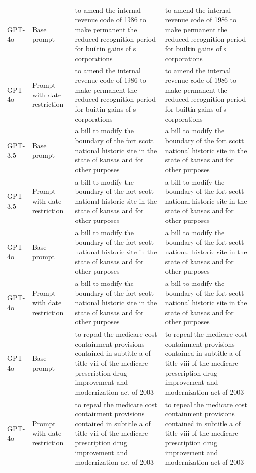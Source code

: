 \begin{longtable}{>{\raggedright\arraybackslash}p{1.4cm}>{\raggedright\arraybackslash}p{1.4cm}>{\raggedright\arraybackslash}p{5.5cm}>{\raggedright\arraybackslash}p{5.5cm}}
GPT-4o & Base prompt & to amend the internal revenue code of 1986 to make permanent the reduced recognition period for builtin gains of s corporations & to amend the internal revenue code of 1986 to make permanent the reduced recognition period for builtin gains of s corporations\\
GPT-4o & Prompt with date restriction & to amend the internal revenue code of 1986 to make permanent the reduced recognition period for builtin gains of s corporations & to amend the internal revenue code of 1986 to make permanent the reduced recognition period for builtin gains of s corporations\\
GPT-3.5 & Base prompt & a bill to modify the boundary of the fort scott national historic site in the state of kansas and for other purposes & a bill to modify the boundary of the fort scott national historic site in the state of kansas and for other purposes\\
GPT-3.5 & Prompt with date restriction & a bill to modify the boundary of the fort scott national historic site in the state of kansas and for other purposes & a bill to modify the boundary of the fort scott national historic site in the state of kansas and for other purposes\\
GPT-4o & Base prompt & a bill to modify the boundary of the fort scott national historic site in the state of kansas and for other purposes & a bill to modify the boundary of the fort scott national historic site in the state of kansas and for other purposes\\
GPT-4o & Prompt with date restriction & a bill to modify the boundary of the fort scott national historic site in the state of kansas and for other purposes & a bill to modify the boundary of the fort scott national historic site in the state of kansas and for other purposes\\
GPT-4o & Base prompt & to repeal the medicare cost containment provisions contained in subtitle a of title viii of the medicare prescription drug improvement and modernization act of 2003 & to repeal the medicare cost containment provisions contained in subtitle a of title viii of the medicare prescription drug improvement and modernization act of 2003\\
GPT-4o & Prompt with date restriction & to repeal the medicare cost containment provisions contained in subtitle a of title viii of the medicare prescription drug improvement and modernization act of 2003 & to repeal the medicare cost containment provisions contained in subtitle a of title viii of the medicare prescription drug improvement and modernization act of 2003\\

\end{longtable}
